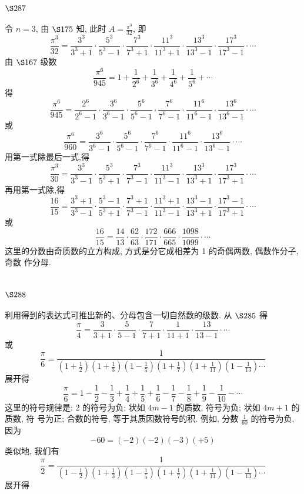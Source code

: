 \section{$\S 287$}

令 $n=3$, 由 $\S 175$ 知, 此时 $A=\frac{\pi^{3}}{32}$, 即
\[
\frac{\pi^{3}}{32}=\frac{3^{3}}{3^{3}+1} \cdot \frac{5^{3}}{5^{3}-1} \cdot \frac{7^{3}}{7^{3}+1} \cdot \frac{11^{3}}{11^{3}+1} \cdot \frac{13^{3}}{13^{3}-1} \cdot \frac{17^{3}}{17^{3}-1} \cdot \cdots
\]
由 $\S 167$ 级数
\[
\frac{\pi^{6}}{945}=1+\frac{1}{2^{6}}+\frac{1}{3^{6}}+\frac{1}{4^{6}}+\frac{1}{5^{6}}+\cdots
\]
得
\[
\frac{\pi^{6}}{945}=\frac{2^{6}}{2^{6}-1} \cdot \frac{3^{6}}{3^{6}-1} \cdot \frac{5^{6}}{5^{6}-1} \cdot \frac{7^{6}}{7^{6}-1} \cdot \frac{11^{6}}{11^{6}-1} \cdot \frac{13^{6}}{13^{6}-1} \cdot \cdots
\]
或
\[
\frac{\pi^{6}}{960}=\frac{3^{6}}{3^{6}-1} \cdot \frac{5^{6}}{5^{6}-1} \cdot \frac{7^{6}}{7^{6}-1} \cdot \frac{11^{6}}{11^{6}-1} \cdot \frac{13^{6}}{13^{6}-1} \cdot \cdots
\]
用第一式除最后一式,得
\[
\frac{\pi^{3}}{30}=\frac{3^{3}}{3^{3}-1} \cdot \frac{5^{3}}{5^{3}+1} \cdot \frac{7^{3}}{7^{3}-1} \cdot \frac{11^{3}}{11^{3}-1} \cdot \frac{13^{3}}{13^{3}+1} \cdot \frac{17^{3}}{17^{3}+1} \cdot \cdots
\]
再用第一式除,得
\[
\frac{16}{15}=\frac{3^{3}+1}{3^{3}-1} \cdot \frac{5^{3}-1}{5^{3}+1} \cdot \frac{7^{3}+1}{7^{3}-1} \cdot \frac{11^{3}+1}{11^{3}-1} \cdot \frac{13^{3}-1}{13^{3}+1} \cdot \frac{17^{3}-1}{17^{3}+1} \cdot \cdots
\]
或
\[
\frac{16}{15}=\frac{14}{13} \cdot \frac{62}{63} \cdot \frac{172}{171} \cdot \frac{666}{665} \cdot \frac{1098}{1099} \cdot \cdots
\]
这里的分数由奇质数的立方构成, 方式是分它成相差为 1 的奇偶两数, 偶数作分子, 奇数 作分母.

\section{$\S 288$}

利用得到的表达式可推出新的、分母包含一切自然数的级数. 从 $\S 285$ 得
\[
\frac{\pi}{4}=\frac{3}{3+1} \cdot \frac{5}{5-1} \cdot \frac{7}{7+1} \cdot \frac{1}{11+1} \cdot \frac{13}{13-1} \cdot \cdots
\]
或
\[
\frac{\pi}{6}=\frac{1}{\left(1+\frac{1}{2}\right)\left(1+\frac{1}{3}\right)\left(1-\frac{1}{5}\right)\left(1+\frac{1}{7}\right)\left(1+\frac{1}{11}\right)\left(1-\frac{1}{13}\right) \cdots}
\]
展开得
\[
\frac{\pi}{6}=1-\frac{1}{2}-\frac{1}{3}+\frac{1}{4}+\frac{1}{5}+\frac{1}{6}-\frac{1}{7}-\frac{1}{8}+\frac{1}{9}-\frac{1}{10}-\cdots
\]
这里的符号规律是: 2 的符号为负; 状如 $4 m-1$ 的质数, 符号为负; 状如 $4 m+1$ 的质数, 符 号为正; 合数的符号, 等于其质因数符号的积. 例如, 分数 $\frac{1}{60}$ 的符号为负, 因为
\[
-60=(-2)(-2)(-3)(+5)
\]
类似地, 我们有
\[
\frac{\pi}{2}=\frac{1}{\left(1-\frac{1}{2}\right)\left(1+\frac{1}{3}\right)\left(1-\frac{1}{5}\right)\left(1+\frac{1}{7}\right)\left(1+\frac{1}{11}\right)\left(1-\frac{1}{13}\right) \cdots}
\]
展开得 

